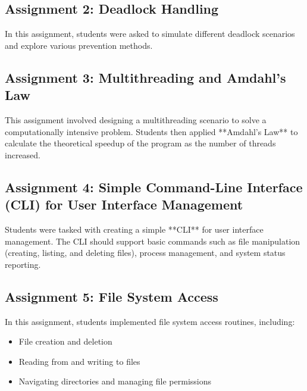 \documentclass[12pt]{article}
\begin{document}
\subsection{Assignment 2: Deadlock Handling}
In this assignment, students were asked to simulate different deadlock scenarios and explore various prevention methods.

\subsection{Assignment 3: Multithreading and Amdahl's Law}
This assignment involved designing a multithreading scenario to solve a computationally intensive problem. Students then applied **Amdahl's Law** to calculate the theoretical speedup of the program as the number of threads increased.

\subsection{Assignment 4: Simple Command-Line Interface (CLI) for User Interface Management}
Students were tasked with creating a simple **CLI** for user interface management. The CLI should support basic commands such as file manipulation (creating, listing, and deleting files), process management, and system status reporting.

\subsection{Assignment 5: File System Access}
In this assignment, students implemented file system access routines, including:
\begin{itemize}
    \item File creation and deletion
    \item Reading from and writing to files
    \item Navigating directories and managing file permissions
\end{itemize}
\end{document}
